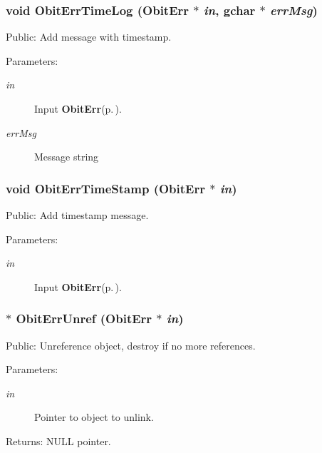 \subsubsection{\setlength{\rightskip}{0pt plus 5cm}void Obit\-Err\-Time\-Log ({\bf Obit\-Err} $\ast$ {\em in}, gchar $\ast$ {\em err\-Msg})}\label{ObitErr_8c_a15}


Public: Add message with timestamp. 

\begin{Desc}
\item[Parameters:]
\begin{description}
\item[{\em in}]Input {\bf Obit\-Err}{\rm (p.\,\pageref{structObitErr})}. \item[{\em err\-Msg}]Message string \end{description}
\end{Desc}
\subsubsection{\setlength{\rightskip}{0pt plus 5cm}void Obit\-Err\-Time\-Stamp ({\bf Obit\-Err} $\ast$ {\em in})}\label{ObitErr_8c_a14}


Public: Add timestamp message. 

\begin{Desc}
\item[Parameters:]
\begin{description}
\item[{\em in}]Input {\bf Obit\-Err}{\rm (p.\,\pageref{structObitErr})}. \end{description}
\end{Desc}
\subsubsection{$\ast$ Obit\-Err\-Unref ({\bf Obit\-Err} $\ast$ {\em in})}\label{ObitErr_8c_a8}


Public: Unreference object, destroy if no more references. 

\begin{Desc}
\item[Parameters:]
\begin{description}
\item[{\em in}]Pointer to object to unlink. \end{description}
\end{Desc}
\begin{Desc}
\item[Returns:]NULL pointer. \end{Desc}

